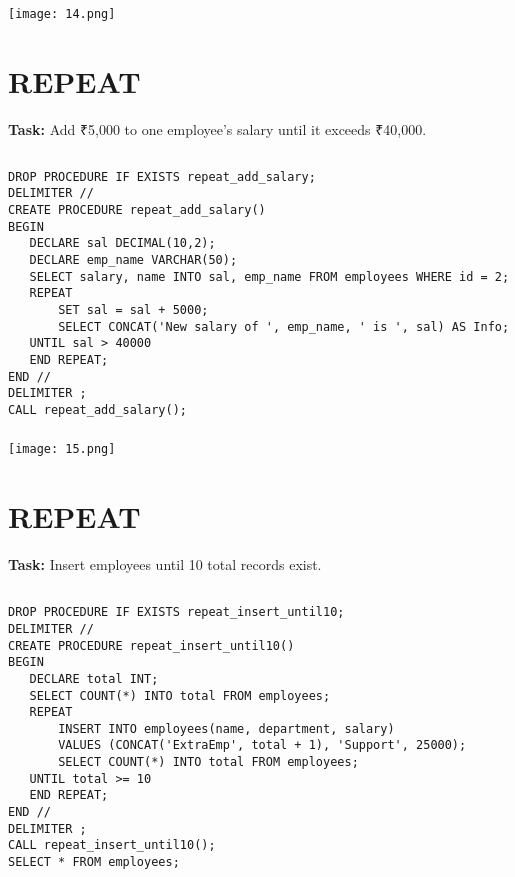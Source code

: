 \documentclass[12pt,a4paper]{article}
\begin{document}
\subsubsection{}
\begin{center}
    \texttt{[image: 14.png]}
\end{center}


\section{REPEAT}
\textbf{Task:} Add ₹5,000 to one employee’s salary until it exceeds ₹40,000.

\subsection{}
\begin{lstlisting}
DROP PROCEDURE IF EXISTS repeat_add_salary;
DELIMITER //
CREATE PROCEDURE repeat_add_salary()
BEGIN
   DECLARE sal DECIMAL(10,2);
   DECLARE emp_name VARCHAR(50);
   SELECT salary, name INTO sal, emp_name FROM employees WHERE id = 2;
   REPEAT
       SET sal = sal + 5000;
       SELECT CONCAT('New salary of ', emp_name, ' is ', sal) AS Info;
   UNTIL sal > 40000
   END REPEAT;
END //
DELIMITER ;
CALL repeat_add_salary();

\end{lstlisting}

\subsubsection{}
\begin{center}
    \texttt{[image: 15.png]}
\end{center}


\section{REPEAT}
\textbf{Task:} Insert employees until 10 total records exist.

\subsection{}
\begin{lstlisting}
DROP PROCEDURE IF EXISTS repeat_insert_until10;
DELIMITER //
CREATE PROCEDURE repeat_insert_until10()
BEGIN
   DECLARE total INT;
   SELECT COUNT(*) INTO total FROM employees;
   REPEAT
       INSERT INTO employees(name, department, salary)
       VALUES (CONCAT('ExtraEmp', total + 1), 'Support', 25000);
       SELECT COUNT(*) INTO total FROM employees;
   UNTIL total >= 10
   END REPEAT;
END //
DELIMITER ;
CALL repeat_insert_until10();
SELECT * FROM employees;

\end{lstlisting}
\end{document}

